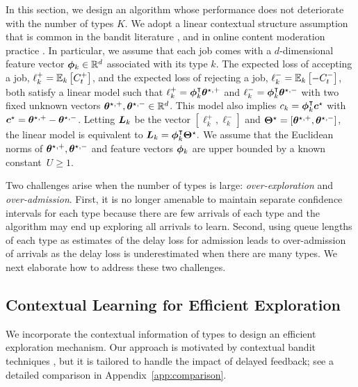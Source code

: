 In this section, we design an algorithm whose performance does not deteriorate with the number of types $K$. We adopt a linear contextual structure assumption that is common in the bandit literature \citep{LiCLS10,ChuLRS11,Abbasi-YadkoriPS11}, and in online content moderation practice \citep{Avadhanula2022}. In particular, we assume that each job comes with a $d$-dimensional feature vector $\boldsymbol{\phi}_k \in \mathbb{R}^d$ associated with its type $k$. The expected loss of accepting a job, $\ell_k^+ = \mathbb E_{k}\left[C_t^+\right]$, and the expected loss of rejecting a job, $\ell_k^- = \mathbb E_{k}\left[-C_t^-\right]$, both satisfy a linear model such that $\ell_k^+ = \boldsymbol{\phi}_k^{\intercal}\boldsymbol{\theta}^{\star,+}$ and $\ell_k^- = \boldsymbol{\phi}_k^{\intercal}\boldsymbol{\theta}^{\star,-}$ with two fixed unknown vectors $\boldsymbol{\theta}^{\star,+},\boldsymbol{\theta}^{\star,-} \in \mathbb{R}^d$. This model also implies $c_k = \boldsymbol{\phi}_k^{\intercal}\boldsymbol{c}^{\star}$ with $\boldsymbol{c}^{\star} = \boldsymbol{\theta}^{\star,+} - \boldsymbol{\theta}^{\star,-}$. Letting $\boldsymbol{L}_k$ be the vector $[\ell_k^+, \ell_k^-]$ and $\boldsymbol{\Theta}^\star = [\boldsymbol{\theta}^{\star,+}, \boldsymbol{\theta}^{\star,-}]$, the linear model is equivalent to $\boldsymbol{L}_k = \boldsymbol{\phi}_k^{\intercal}\boldsymbol{\Theta}^\star.$ We assume that the Euclidean norms of $\boldsymbol{\theta}^{\star,+},\boldsymbol{\theta}^{\star,-}$ and feature vectors $\boldsymbol{\phi}_k$ are upper bounded by a known constant~$U\geq 1$.

Two challenges arise when the number of types is large: \emph{over-exploration} and \emph{over-admission}. First, it is no longer amenable to maintain separate confidence intervals for each type because there are few arrivals of each type and the algorithm may end up exploring all arrivals to learn. Second, using queue lengths of each type as estimates of the delay loss for admission leads to over-admission of arrivals as the delay loss is underestimated when there are many types. We next elaborate how to address these two challenges.

\subsection{Contextual Learning for Efficient Exploration}
We incorporate the contextual information of types to design an efficient exploration mechanism. Our approach is motivated by contextual bandit techniques \citep{Abbasi-YadkoriPS11}, but it is tailored to handle the impact of delayed feedback; see a detailed comparison in Appendix~\ref{app:comparison}.

